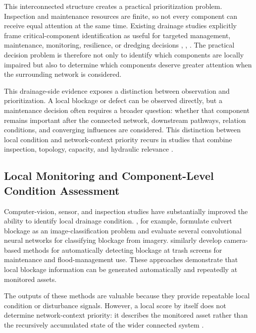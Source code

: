 This interconnected structure creates a practical prioritization
problem. Inspection and maintenance resources are finite, so not every
component can receive equal attention at the same time. Existing
drainage studies explicitly frame critical-component identification as
useful for targeted management, maintenance, monitoring, resilience, or
dredging decisions \citep{simone2022}, \citep{simone2023}, \citep{dastgir2023,dastgir2024,meijer2023,zhang2025}. The practical
decision problem is therefore not only to identify which components are
locally impaired but also to determine which components deserve greater
attention when the surrounding network is considered.

This drainage-side evidence exposes a distinction between observation
and prioritization. A local
blockage or defect can be observed directly, but a maintenance decision
often requires a broader question: whether that component remains
important after the connected network, downstream pathways, relation
conditions, and converging influences are considered. This distinction
between local condition and network-context priority recurs in studies
that combine inspection, topology, capacity, and hydraulic relevance
\citep{simone2022,simone2023,dastgir2023,meijer2023,zhang2025}.

\subsection{Local Monitoring and Component-Level Condition
Assessment}\label{local-monitoring-and-component-level-condition-assessment}

Computer-vision, sensor, and inspection studies have substantially
improved the ability to identify local drainage condition. \citet{iqbal2021}, for example, formulate culvert blockage as an
image-classification problem and evaluate several convolutional neural
networks for classifying blockage from imagery. \citet{vandaele2024}
similarly develop camera-based methods for automatically detecting
blockage at trash screens for maintenance and flood-management use.
These approaches demonstrate that local blockage information can be
generated automatically and repeatedly at monitored assets.

The outputs of these methods are valuable because they provide repeatable
local condition or disturbance signals. However, a local score by itself
does not determine network-context priority: it describes the monitored
asset rather than the recursively accumulated state of the wider connected
system \citep{iqbal2021,vandaele2024,simone2022}.

